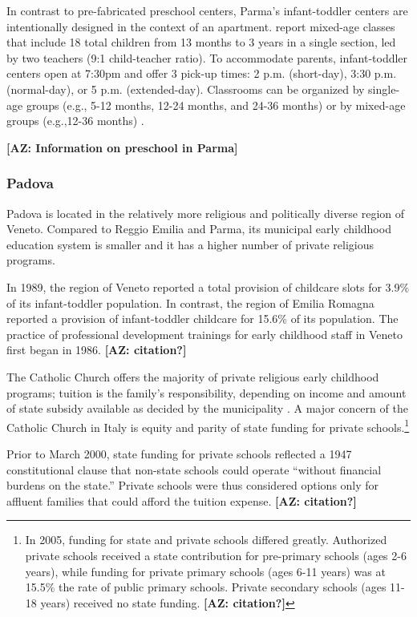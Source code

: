 In contrast to pre-fabricated preschool centers, Parma's infant-toddler centers are intentionally designed in the context of an apartment. \citet{Terzi-Cantarelli_2001_Parma} report mixed-age classes that include 18 total children from 13 months to 3 years in a single section, led by two teachers (9:1 child-teacher ratio). To accommodate parents, infant-toddler centers open at 7:30pm and offer 3 pick-up times: 2 p.m. (short-day), 3:30 p.m. (normal-day), or 5 p.m. (extended-day). Classrooms can be organized by single-age groups (e.g., 5-12 months, 12-24 months, and 24-36 months) or by mixed-age groups (e.g.,12-36 months) \citep{Majorano-etal_2009_CC-in-P}.

\textbf{[AZ: Information on preschool in Parma]}

\subsubsection{Padova}
Padova is located in the relatively more religious and politically diverse region of Veneto. Compared to Reggio Emilia and Parma, its municipal early childhood education system is smaller and it has a higher number of private religious programs. 

In 1989, the region of Veneto reported a total provision of childcare slots for 3.9\% of its infant-toddler population. In contrast, the region of Emilia Romagna reported a provision of infant-toddler childcare for 15.6\% of its population. The practice of professional development trainings for early childhood staff in Veneto first began in 1986. \textbf{[AZ: citation?]}

The Catholic Church offers the majority of private religious early childhood programs; tuition is the family's responsibility, depending on income and amount of state subsidy available as decided by the municipality \citep{Hohnerlein_2009_Paradox-Public-Preschools}.  A major concern of the Catholic Church in Italy is equity and parity of state funding for private schools.\footnote{In 2005, funding for state and private schools differed greatly. Authorized private schools received a state contribution for pre-primary schools (ages 2-6 years), while funding for private primary schools (ages 6-11 years) was at 15.5\% the rate of public primary schools. Private secondary schools (ages 11-18 years) received no state funding. \textbf{[AZ: citation?]}}

Prior to March 2000, state funding for private schools reflected a 1947 constitutional clause that non-state schools could operate ``without financial burdens on the state.'' Private schools were thus considered options only for affluent families that could afford the tuition expense. \textbf{[AZ: citation?]}


